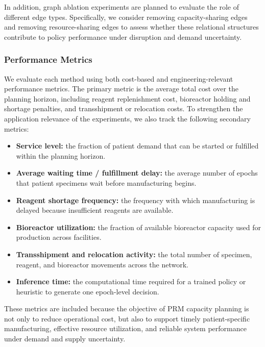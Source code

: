 \documentclass[preprint,review,12pt,nonatbib]{elsarticle}
\begin{document}
In addition, graph ablation experiments are planned to evaluate the role of different edge types. Specifically, we consider removing capacity-sharing edges and removing resource-sharing edges to assess whether these relational structures contribute to policy performance under disruption and demand uncertainty.

\subsubsection{Performance Metrics}

We evaluate each method using both cost-based and engineering-relevant performance metrics. The primary metric is the average total cost over the planning horizon, including reagent replenishment cost, bioreactor holding and shortage penalties, and transshipment or relocation costs. To strengthen the application relevance of the experiments, we also track the following secondary metrics:
\begin{itemize}
    \item \textbf{Service level:} the fraction of patient demand that can be started or fulfilled within the planning horizon.
    \item \textbf{Average waiting time / fulfillment delay:} the average number of epochs that patient specimens wait before manufacturing begins.
    \item \textbf{Reagent shortage frequency:} the frequency with which manufacturing is delayed because insufficient reagents are available.
    \item \textbf{Bioreactor utilization:} the fraction of available bioreactor capacity used for production across facilities.
    \item \textbf{Transshipment and relocation activity:} the total number of specimen, reagent, and bioreactor movements across the network.
    \item \textbf{Inference time:} the computational time required for a trained policy or heuristic to generate one epoch-level decision.
\end{itemize}

These metrics are included because the objective of PRM capacity planning is not only to reduce operational cost, but also to support timely patient-specific manufacturing, effective resource utilization, and reliable system performance under demand and supply uncertainty.
\end{document}
